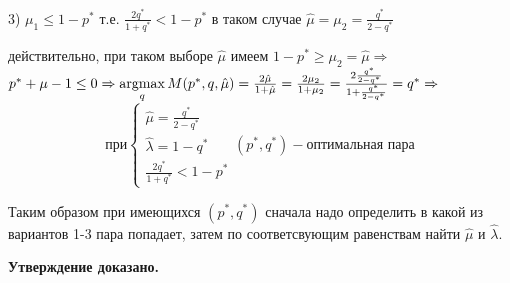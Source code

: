 \begin{flushleft}
3) $\mu_1 \leq 1-p^{*}$ т.е. $\frac{2q^{*}}{1+q^{*}} < 1-p^{*}$
в таком случае $\hat{\mu}=\mu_2=\frac{q^{*}}{2-q^{*}}$ 

действительно, при таком выборе $\hat{\mu}$ имеем $1-p^{*} \geq \mu_2 = \hat\mu \Rightarrow$
$p^{*}+\mu-1 \leq 0 \Rightarrow \operatorname*{argmax}\limits_{q}M(p^{*},q,\hat{\mu})=
\frac{2\hat\mu}{1+\hat\mu}=\frac{2\mu_2}{1+\mu_2}=\frac{2\frac{q^{*}}{2-q^{*}}}{1+\frac{q^{*}}{2-q^{*}}}=
q^{*} \Rightarrow$ 
\[
\textrm{при}
\begin{cases}
\hat\mu=\frac{q^{*}}{2-q^{*}} \\
\hat\lambda = 1 - q^{*} \\
\frac{2q^{*}}{1+q^{*}} < 1-p^{*}
\end{cases}
(p^{*}, q^{*}) - \textrm{оптимальная пара}
\] 

Таким образом при имеющихся $(p^{*},q^{*})$ сначала надо определить в какой из вариантов 1-3 пара попадает, затем
по соответсвующим равенствам найти $\hat\mu$ и $\hat\lambda$.

\textbf{Утверждение доказано.}
\end{flushleft}

